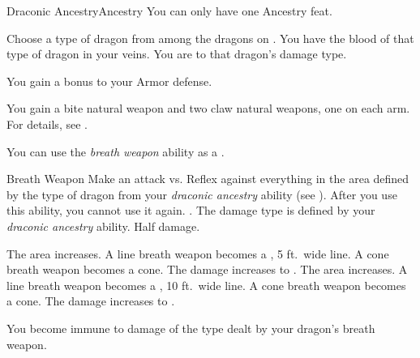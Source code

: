     \begin{feat}{Draconic Ancestry}{Ancestry}
         You can only have one Ancestry feat.

         Choose a type of dragon from among the dragons on .
        You have the blood of that type of dragon in your veins.
        You are  to that dragon's damage type.

         You gain a  bonus to your Armor defense.

         You gain a bite natural weapon and two claw natural weapons, one on each arm.
        For details, see .

         You can use the \textit{breath weapon} ability as a .
        \begin{activeability}{Breath Weapon}
            \rankline
            Make an attack vs. Reflex against everything in the area defined by the type of dragon from your \textit{draconic ancestry} ability (see ).
            After you use this ability, you  cannot use it again.
            \hit \damagerankthree{}.
            The damage type is defined by your \textit{draconic ancestry} ability.
            \miss Half damage.

            \rankline
             The area increases.
                A line breath weapon becomes a \arealarge, 5 ft.\ wide line.
                A cone breath weapon becomes a \areamed cone.
             The damage increases to \damagerankfive{}.
             The area increases.
                A line breath weapon becomes a \areahuge, 10 ft.\ wide line.
                A cone breath weapon becomes a \arealarge cone.
             The damage increases to \damagerankseven{}.
        \end{activeability}

         You become immune to damage of the type dealt by your dragon's breath weapon.


\end{feat}
